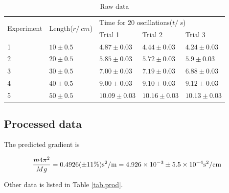 \documentclass[a4paper]{article}
\begin{document}
\begin{table}[ht!]\centering
    \caption{Raw data}
    \label{tab.raw}
    \begin{tabular}{lllll}
    \hline
    \multirow{2}{*}{Experiment} & \multirow{2}{*}{Length($r/\SI{}{cm}$)} & \multicolumn{3}{l}{Time for 20 oscillations($t/\SI{}{s}$)} \\
                                &                                        & \small Trial 1     & \small Trial 2    & \small Trial 3    \\ \hline
    1                           & $10 \pm 0.5$                           & $ 4.87 \pm 0.03$   & $ 4.44 \pm 0.03$  & $ 4.24 \pm 0.03$  \\
    2                           & $20 \pm 0.5$                           & $ 5.85 \pm 0.03$   & $ 5.72 \pm 0.03$  & $ 5.9 \pm 0.03$   \\
    3                           & $30 \pm 0.5$                           & $ 7.00 \pm 0.03$   & $ 7.19 \pm 0.03$  & $ 6.88 \pm 0.03$  \\
    4                           & $40 \pm 0.5$                           & $ 9.00 \pm 0.03$   & $ 9.10 \pm 0.03$  & $ 9.12 \pm 0.03$  \\
    5                           & $50 \pm 0.5$                           & $ 10.09 \pm 0.03$  & $ 10.16 \pm 0.03$ & $ 10.13 \pm 0.03$ \\ \hline
    \end{tabular}
\end{table}
\subsection{Processed data}

The predicted gradient is 

$${m4\pi^2 \over Mg} = 0.4926 (\pm 11\%)\SI{}{s^2/m} = 4.926\times 10^{-3} \pm 5.5\times 10^{-4}\SI{}{s^2/cm}$$

Other data is listed in Table \ref{tab.prod}.
\end{document}
